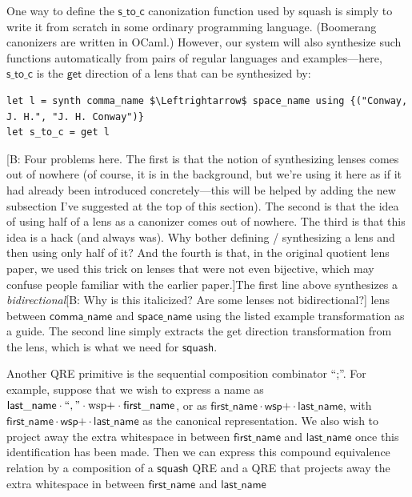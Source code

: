 \documentclass[acmsmall,review,anonymous]{acmart}
\newcommand{\FINISH}[3]{\ifdraft\textcolor{#1}{[#2: #3]}\fi}
\newcommand{\bcp}[1]{\FINISH{dkred}{B}{#1}}
\newcommand{\kw}[1]{\ensuremath{\mathsf{#1}}}
\newcommand{\codefont}[1]{\ensuremath{\mathsf{#1}}}
\begin{document}
One way to define the \codefont{s\_to\_c} canonization function used by squash
is simply to write it from scratch in some ordinary programming language. (Boomerang canonizers are written in OCaml.)
However, our system will also synthesize such functions automatically from pairs
of regular languages and examples---here, \codefont{s\_to\_c} is the
\codefont{get} direction of a lens that can be synthesized by:
%
\begin{lstlisting}
let l = synth comma_name $\Leftrightarrow$ space_name using {("Conway, J. H.", "J. H. Conway")}
let s_to_c = get l
\end{lstlisting}
%
\bcp{Four problems here.  The first is that the notion of synthesizing lenses
comes out of nowhere (of course, it is in the background, but we're using it
here as if it had already been introduced concretely---this will be helped
by adding the new subsection I've suggested at the top of this section).
The second is that the idea of using half of a lens 
as a canonizer comes out of nowhere.  The third is that this idea is a hack (and
always was).  Why bother defining / synthesizing a lens and then using only
half of it?  And the fourth is that, in the original quotient lens paper,
we used this trick on lenses that were not even bijective, which may confuse
people familiar with the earlier paper.}The first line above synthesizes a
\emph{bidirectional}\bcp{Why is this italicized?  Are some lenses not
  bidirectional?} lens between 
\codefont{comma\_name} and \codefont{space\_name} using the listed example
transformation as a guide.  The second line simply
extracts the get direction transformation from the lens,
which is what we need for \kw{squash}.

Another QRE primitive is the sequential composition combinator ``;''.  For
example, suppose that we wish to express a name as $\kw{last\_name \cdot
``,\text{''} \cdot \text{wsp+} \cdot first\_name}$, or as $\kw{first\_name\cdot
\text{wsp+} \cdot last\_name}$, with $\kw{first\_name\cdot \text{wsp+} \cdot
last\_name}$ as the canonical representation. We also wish to project away the
extra whitespace in between \kw{first\_name} and \kw{last\_name} once this
identification has been made. Then we can express this compound equivalence
relation by a composition of a \kw{squash} QRE and a QRE that projects away
the extra whitespace in between \codefont{first\_name} and \codefont{last\_name}
\end{document}
